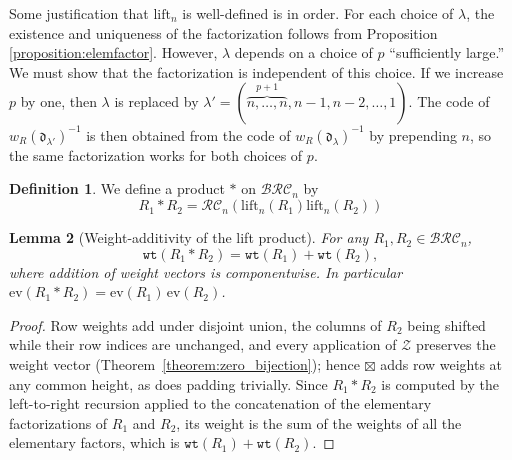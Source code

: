 \documentclass{amsart}
\newtheorem{lemma}{Lemma}[subsection]
\theoremstyle{definition}
\newtheorem{definition}[lemma]{Definition}
\theoremstyle{remark}
\numberwithin{equation}{subsection}
\newcommand{\wof}[1]{w_{#1}}
\newcommand{\wtt}{\mathtt{wt}}
\newcommand{\zeromap}{\mathcal{Z}}
\newcommand{\BRC}{\mathcal{BRC}}
\newcommand{\RC}{\mathcal{RC}}
\newcommand{\dom}{\mathfrak{d}}
\begin{document}
Some justification that $\mathrm{lift}_n$ is well-defined is in order. For each choice of $\lambda$, the existence and uniqueness of the factorization follows from Proposition \ref{proposition:elemfactor}. However, $\lambda$ depends on a choice of $p$ ``sufficiently large.'' We must show that the factorization is independent of this choice. If we increase $p$ by one, then $\lambda$ is replaced by $\lambda' = (\overbrace{n,\ldots,n}^{p+1},n-1,n-2,\ldots,1)$. The code of $\wof{R}(\dom_{\lambda'})^{-1}$ is then obtained from the code of $\wof{R}(\dom_\lambda)^{-1}$ by prepending $n$, so the same factorization works for both choices of $p$.

\begin{definition}
We define a product $*$ on $\BRC_n$ by
$$R_1*R_2 = \RC_n(\mathrm{lift}_n(R_1)\mathrm{lift}_n(R_2))$$
\end{definition}

\begin{lemma}[Weight-additivity of the lift product]\label{lemma:liftweight}
For any $R_1, R_2\in\BRC_n$,
$$\wtt(R_1 * R_2) = \wtt(R_1) + \wtt(R_2),$$
where addition of weight vectors is componentwise. In particular $\mathrm{ev}(R_1*R_2)=\mathrm{ev}(R_1)\,\mathrm{ev}(R_2)$.
\end{lemma}
\begin{proof}
Row weights add under disjoint union, the columns of $R_2$ being shifted while their row indices are unchanged, and every application of $\zeromap$ preserves the weight vector (Theorem~\ref{theorem:zero_bijection}); hence $\boxtimes$ adds row weights at any common height, as does padding trivially. Since $R_1*R_2$ is computed by the left-to-right recursion applied to the concatenation of the elementary factorizations of $R_1$ and $R_2$, its weight is the sum of the weights of all the elementary factors, which is $\wtt(R_1)+\wtt(R_2)$.
\end{proof}
\end{document}

